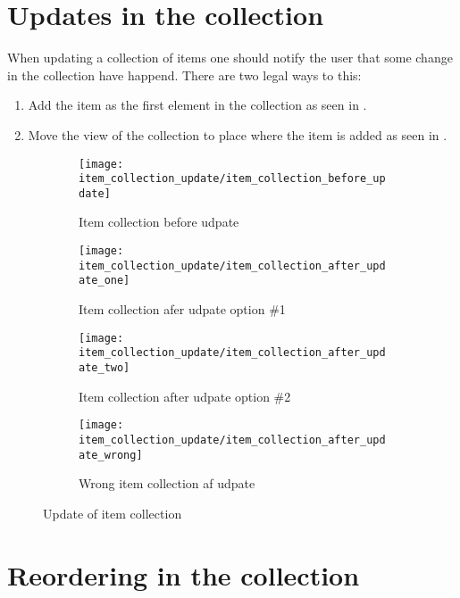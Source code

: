 \FloatBarrier

\section{Updates in the collection}
\label{sec:updates_in_the_collection}

When updating a collection of items one should notify the user that some change in the collection have happend. There are two legal ways to this:
\begin{enumerate}
    \item Add the item as the first element in the collection as seen in .
    \item Move the view of the collection to place where the item is added as seen in .
\end{enumerate}

\begin{figure}[htbp]
    \centering
    \begin{subfigure}[t]{0.2\textwidth}
        \centering
        \texttt{[image: item\_collection\_update/item\_collection\_before\_update]}
        \caption{Item collection before udpate}
        \label{fig:item_collection_before_update}
    \end{subfigure}
    \hspace{2em} 
    \begin{subfigure}[t]{0.2\textwidth}
        \centering
        \texttt{[image: item\_collection\_update/item\_collection\_after\_update\_one]}
        \caption{Item collection afer udpate option \#1}
        \label{fig:item_collection_after_update_one}
    \end{subfigure}
    \hspace{2em} 
    \begin{subfigure}[t]{0.2\textwidth}
        \centering
        \texttt{[image: item\_collection\_update/item\_collection\_after\_update\_two]}
        \caption{Item collection after udpate option \#2}
        \label{fig:item_collection_after_update_two}
    \end{subfigure}
    \hspace{2em} 
    \begin{subfigure}[t]{0.2\textwidth}
        \centering
        \texttt{[image: item\_collection\_update/item\_collection\_after\_update\_wrong]}
        \caption{Wrong item collection af udpate}
        \label{fig:item_collection_after_update_wrong}
    \end{subfigure}
    
    \caption{Update of item collection}
    \label{fig:item_collection_update}
\end{figure}

\FloatBarrier

\section{Reordering in the collection}
\label{sec:reordering_in_the_collection}

